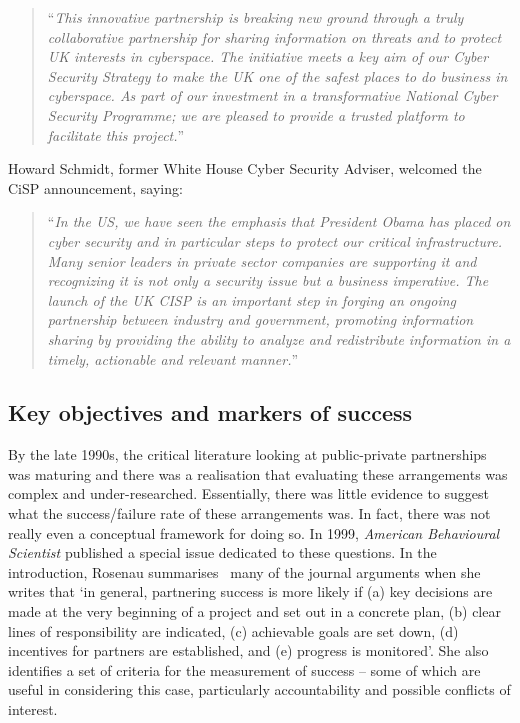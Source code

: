 \documentclass[a4paper,11pt]{article}
\begin{document}
\begin{quotation}
\noindent ``{\emph{This innovative partnership is breaking new ground through a truly
collaborative partnership for sharing information on threats and to
protect UK interests in cyberspace. The initiative meets a key aim of
our Cyber Security Strategy to make the UK one of the safest places to
do business in cyberspace. As part of our investment in a
transformative National Cyber Security Programme; we are pleased to
provide a trusted platform to facilitate this project.}}''
\end{quotation}

Howard Schmidt, former White House Cyber Security Adviser, welcomed
the CiSP announcement, saying:

\begin{quotation}
\noindent ``{\emph{In the US, we have seen the emphasis that President Obama has
placed on cyber security and in particular steps to protect our
critical infrastructure. Many senior leaders in private sector
companies are supporting it and recognizing it is not only a security
issue but a business imperative. The launch of the UK CISP is an
important step in forging an ongoing partnership between industry and
government, promoting information sharing by providing the ability to
analyze and redistribute information in a timely, actionable and
relevant manner.}}''
\end{quotation}


\subsection{Key objectives and markers of success}

By the late 1990s, the critical literature looking at public-private
partnerships was maturing and there was a realisation that evaluating
these arrangements was complex and under-researched. Essentially,
there was little evidence to suggest what the success/failure rate of
these arrangements was. In fact, there was not really even a
conceptual framework for doing so. In 1999, {\emph{American Behavioural
Scientist}} published a special issue dedicated to these questions. In
the introduction, Rosenau summarises~\cite{rosenau:1999} many of the
journal arguments when she writes that `in general, partnering success
is more likely if (a) key decisions are made at the very beginning of
a project and set out in a concrete plan, (b) clear lines of
responsibility are indicated, (c) achievable goals are set down, (d)
incentives for partners are established, and (e) progress is
monitored'. She also identifies a set of criteria for the measurement
of success -- some of which are useful in considering this case,
particularly accountability and possible conflicts of interest.   
\end{document}
